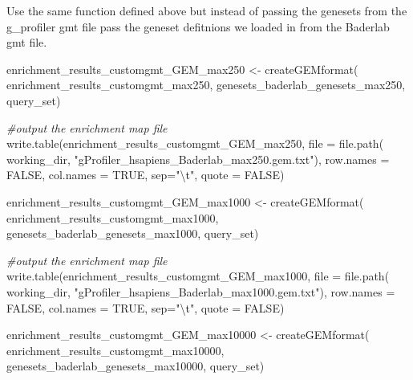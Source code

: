 \documentclass[
]{book}
\newenvironment{Shaded}{\begin{snugshade}}{\end{snugshade}}
\newcommand{\AttributeTok}[1]{\textcolor[rgb]{0.77,0.63,0.00}{#1}}
\newcommand{\CommentTok}[1]{\textcolor[rgb]{0.56,0.35,0.01}{\textit{#1}}}
\newcommand{\ConstantTok}[1]{\textcolor[rgb]{0.00,0.00,0.00}{#1}}
\newcommand{\FunctionTok}[1]{\textcolor[rgb]{0.00,0.00,0.00}{#1}}
\newcommand{\NormalTok}[1]{#1}
\newcommand{\OtherTok}[1]{\textcolor[rgb]{0.56,0.35,0.01}{#1}}
\newcommand{\SpecialCharTok}[1]{\textcolor[rgb]{0.00,0.00,0.00}{#1}}
\newcommand{\StringTok}[1]{\textcolor[rgb]{0.31,0.60,0.02}{#1}}
\begin{document}
Use the same function defined above but instead of passing the genesets from the g\_profiler gmt file pass the geneset defitnions we loaded in from the Baderlab gmt file.

\begin{Shaded}
\begin{Highlighting}[]
\NormalTok{enrichment\_results\_customgmt\_GEM\_max250 }\OtherTok{\textless{}{-}} \FunctionTok{createGEMformat}\NormalTok{(}
\NormalTok{                                    enrichment\_results\_customgmt\_max250, }
\NormalTok{                                    genesets\_baderlab\_genesets\_max250, }
\NormalTok{                                    query\_set)}

\CommentTok{\#output the enrichment map file}
\FunctionTok{write.table}\NormalTok{(enrichment\_results\_customgmt\_GEM\_max250, }
                  \AttributeTok{file =} \FunctionTok{file.path}\NormalTok{(}
\NormalTok{                    working\_dir, }\StringTok{"gProfiler\_hsapiens\_Baderlab\_max250.gem.txt"}\NormalTok{),}
                  \AttributeTok{row.names =} \ConstantTok{FALSE}\NormalTok{, }
                  \AttributeTok{col.names =} \ConstantTok{TRUE}\NormalTok{, }\AttributeTok{sep=}\StringTok{"}\SpecialCharTok{\textbackslash{}t}\StringTok{"}\NormalTok{,}
                  \AttributeTok{quote =} \ConstantTok{FALSE}\NormalTok{)}
       
\NormalTok{enrichment\_results\_customgmt\_GEM\_max1000 }\OtherTok{\textless{}{-}} \FunctionTok{createGEMformat}\NormalTok{(}
\NormalTok{                                  enrichment\_results\_customgmt\_max1000,}
\NormalTok{                                  genesets\_baderlab\_genesets\_max1000, }
\NormalTok{                                  query\_set)}

\CommentTok{\#output the enrichment map file}
\FunctionTok{write.table}\NormalTok{(enrichment\_results\_customgmt\_GEM\_max1000, }
                  \AttributeTok{file =} \FunctionTok{file.path}\NormalTok{(}
\NormalTok{                    working\_dir, }\StringTok{"gProfiler\_hsapiens\_Baderlab\_max1000.gem.txt"}\NormalTok{),}
                  \AttributeTok{row.names =} \ConstantTok{FALSE}\NormalTok{, }
                  \AttributeTok{col.names =} \ConstantTok{TRUE}\NormalTok{, }\AttributeTok{sep=}\StringTok{"}\SpecialCharTok{\textbackslash{}t}\StringTok{"}\NormalTok{,}
                  \AttributeTok{quote =} \ConstantTok{FALSE}\NormalTok{)}

\NormalTok{enrichment\_results\_customgmt\_GEM\_max10000 }\OtherTok{\textless{}{-}} \FunctionTok{createGEMformat}\NormalTok{(}
\NormalTok{                                  enrichment\_results\_customgmt\_max10000,}
\NormalTok{                                  genesets\_baderlab\_genesets\_max10000, }
\NormalTok{                                  query\_set)}


\end{Highlighting}
\end{Shaded}
\end{document}
